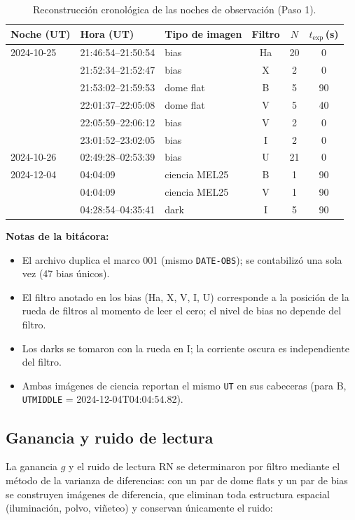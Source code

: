 \documentclass[10pt,a4paper,twocolumn]{article}
\begin{document}
\begin{table}[t]
\centering
\caption{Reconstrucción cronológica de las noches de observación (Paso 1).}
\label{tab:noches}
\footnotesize
\begin{tabular}{@{}lllccc@{}}
\toprule
Noche (UT) & Hora (UT) & Tipo de imagen & Filtro & $N$ & $t_{\mathrm{exp}}$\,(s) \\
\midrule
2024-10-25 & 21:46:54--21:50:54 & bias          & Ha & 20 & 0  \\
           & 21:52:34--21:52:47 & bias          & X  & 2  & 0  \\
           & 21:53:02--21:59:53 & dome flat     & B  & 5  & 90 \\
           & 22:01:37--22:05:08 & dome flat     & V  & 5  & 40 \\
           & 22:05:59--22:06:12 & bias          & V  & 2  & 0  \\
           & 23:01:52--23:02:05 & bias          & I  & 2  & 0  \\
2024-10-26 & 02:49:28--02:53:39 & bias          & U  & 21 & 0  \\
\midrule
2024-12-04 & 04:04:09           & ciencia MEL25 & B  & 1  & 90 \\
           & 04:04:09           & ciencia MEL25 & V  & 1  & 90 \\
           & 04:28:54--04:35:41 & dark          & I  & 5  & 90 \\
\bottomrule
\end{tabular}
\end{table}

\noindent\textbf{Notas de la bitácora:}
\begin{itemize}\footnotesize
\item El archivo  duplica el marco 001 (mismo \texttt{DATE-OBS}); se contabilizó una sola vez (47 bias únicos).
\item El filtro anotado en los bias (Ha, X, V, I, U) corresponde a la posición de la rueda de filtros al momento de leer el cero; el nivel de bias no depende del filtro.
\item Los darks se tomaron con la rueda en I; la corriente oscura es independiente del filtro.
\item Ambas imágenes de ciencia reportan el mismo \texttt{UT} en sus cabeceras (para B, \texttt{UTMIDDLE} = 2024-12-04T04:04:54.82).
\end{itemize}

\subsection{Ganancia y ruido de lectura}
La ganancia $g$ y el ruido de lectura RN se determinaron por filtro mediante el
método de la varianza de diferencias: con un par de dome flats y un par de bias
se construyen imágenes de diferencia, que eliminan toda estructura espacial
(iluminación, polvo, viñeteo) y conservan únicamente el ruido:
\end{document}
